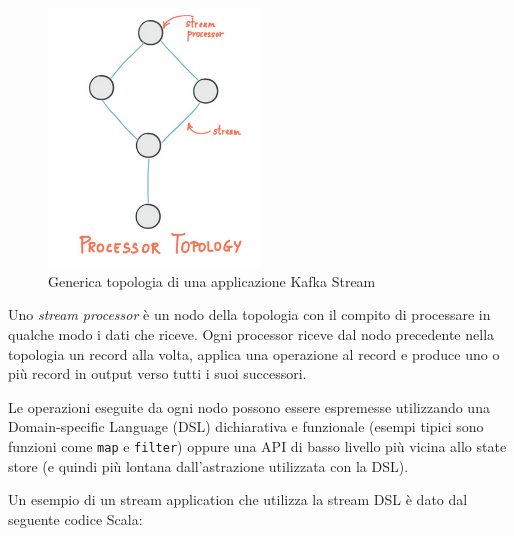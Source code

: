 \documentclass[]{article}
\begin{document}
\begin{figure}
\centering
\includegraphics[width=0.50000\textwidth]{../images/topology-stream.png}
\caption{Generica topologia di una applicazione Kafka Stream
\label{figure_5}}
\end{figure}

Uno \emph{stream processor} è un nodo della topologia con il compito di
processare in qualche modo i dati che riceve. Ogni processor riceve dal
nodo precedente nella topologia un record alla volta, applica una
operazione al record e produce uno o più record in output verso tutti i
suoi successori.

Le operazioni eseguite da ogni nodo possono essere espremesse
utilizzando una Domain-specific Language (DSL) dichiarativa e funzionale
(esempi tipici sono funzioni come \texttt{map} e \texttt{filter}) oppure
una API di basso livello più vicina allo state store (e quindi più
lontana dall'astrazione utilizzata con la DSL).

Un esempio di un stream application che utilizza la stream DSL è dato
dal seguente codice Scala:

\small 
\end{document}
